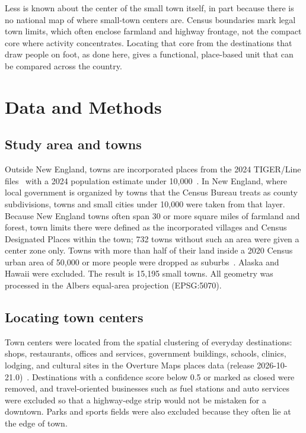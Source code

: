 \documentclass[11pt,letterpaper]{article}
\begin{document}
Less is known about the center of the small town itself, in part because there is no national map of where small-town centers are. Census boundaries mark legal town limits, which often enclose farmland and highway frontage, not the compact core where activity concentrates. Locating that core from the destinations that draw people on foot, as done here, gives a functional, place-based unit that can be compared across the country.

\section{Data and Methods}
\subsection{Study area and towns}
Outside New England, towns are incorporated places from the 2024 TIGER/Line files~\cite{tiger} with a 2024 population estimate under 10{,}000~\cite{popest}. In New England, where local government is organized by towns that the Census Bureau treats as county subdivisions, towns and small cities under 10{,}000 were taken from that layer. Because New England towns often span 30 or more square miles of farmland and forest, town limits there were defined as the incorporated villages and Census Designated Places within the town; 732 towns without such an area were given a center zone only. Towns with more than half of their land inside a 2020 Census urban area of 50{,}000 or more people were dropped as suburbs~\cite{ua}. Alaska and Hawaii were excluded. The result is 15{,}195 small towns. All geometry was processed in the Albers equal-area projection (EPSG:5070).

\subsection{Locating town centers}
Town centers were located from the spatial clustering of everyday destinations: shops, restaurants, offices and services, government buildings, schools, clinics, lodging, and cultural sites in the Overture Maps places data (release 2026-10-21.0)~\cite{overture}. Destinations with a confidence score below 0.5 or marked as closed were removed, and travel-oriented businesses such as fuel stations and auto services were excluded so that a highway-edge strip would not be mistaken for a downtown. Parks and sports fields were also excluded because they often lie at the edge of town.
\end{document}
